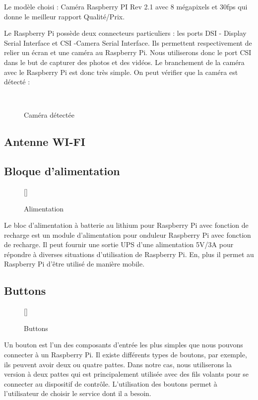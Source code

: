 {    Le modèle choisi : Caméra Raspberry PI Rev 2.1 avec 8 mégapixels et 30fps  qui donne le meilleur rapport Qualité/Prix.
    
    Le Raspberry Pi possède deux connecteurs particuliers : les ports DSI - Display Serial Interface et CSI -Camera Serial Interface. Ils permettent respectivement de relier un écran et une caméra au Raspberry Pi. Nous utiliserons donc  le port CSI dans le but de capturer des photos et des vidéos. Le branchement de la caméra avec le Raspberry Pi est donc très simple.
    On peut vérifier que la caméra est détecté :
    \begin{figure}[H] 
    \centering
    \\[0.5cm]
    \caption{Caméra détectée}
    \label{fig:figure1}
    \end{figure}

    

    \subsection{Antenne WI-FI}
    \subsection{Bloque d'alimentation}
    \begin{figure}
    \centering
    \raisebox{0pt}[\dimexpr{}\baselineskip\relax]{}
    \caption{Alimentation}
    \label{fig:figure3}
    \end{figure} 
    Le bloc d'alimentation à batterie au lithium pour Raspberry Pi avec fonction de recharge est un module d'alimentation pour onduleur Raspberry Pi avec fonction de recharge. Il peut fournir une sortie UPS d'une alimentation 5V/3A pour répondre à diverses situations d'utilisation de Raspberry Pi. En, plus il permet au Raspberry Pi d'être utilisé de manière mobile.\\[1cm]
    
    
    \subsection{Buttons}
    \begin{figure}
    \centering
    \raisebox{0pt}[\dimexpr{}\baselineskip\relax]{}
    \caption{Buttons}
    \label{fig:figure3}
    \end{figure} 
    Un bouton est l'un des composants d'entrée les plus simples que nous pouvons connecter à un Raspberry Pi. Il existe différents types de boutons, par exemple, ils peuvent avoir deux ou quatre pattes. Dans notre cas, nous utiliserons la version à deux pattes qui est principalement utilisée avec des fils volants pour se connecter au dispositif de contrôle. L'utilisation des boutons permet à l'utilisateur de choisir le service dont il a besoin.
    
}
